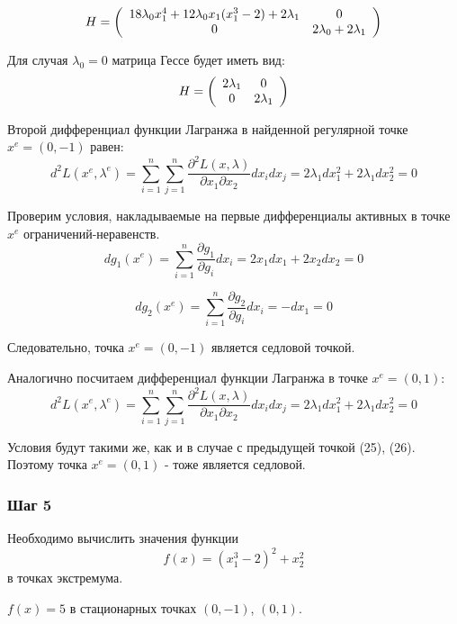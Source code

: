 \documentclass[a4paper, 12pt]{article}   	%
\begin{document}
    \begin{equation}
        H = 
        \left(
        \begin{array}{c c}
            18 \lambda_0 x_1^4 + 12 \lambda_0 x_1 (x_1^3 - 2) + 2 \lambda_1 & 0\\
            0 & 2 \lambda_0 + 2 \lambda_1
        \end{array}
        \right)
    \end{equation}
    
    Для случая $\lambda_0 = 0$ матрица Гессе будет иметь вид:
    \begin{equation}
        H = 
        \left(
        \begin{array}{c c}
            2 \lambda_1 & 0\\
            0 & 2 \lambda_1
        \end{array}
        \right)
    \end{equation}
    
    Второй дифференциал функции Лагранжа в найденной регулярной точке $x^e = (0, -1)$ равен:
    \begin{equation}
        d^2 L(x^e, \lambda^e) = \sum^{n}_{i=1} \sum^{n}_{j=1}{\frac{\partial^2 L(x, \lambda)}{\partial x_1 \partial x_2 } dx_i dx_j} = 2 \lambda_1 dx_1^2 + 2 \lambda_1 dx_2^2 = 0
    \end{equation}
    
    Проверим условия, накладываемые на первые дифференциалы активных в точке $x^e$ ограничений-неравенств.
    \begin{equation}
        dg_1(x^e) = \sum^{n}_{i=1}{\frac{\partial g_1}{\partial g_i} dx_i} = 2x_1 dx_1 + 2x_2 dx_2 = 0
    \end{equation}
    
    \begin{equation}
        dg_2(x^e) = \sum^{n}_{i=1}{\frac{\partial g_2}{\partial g_i} dx_i} = -dx_1 = 0
    \end{equation}
    
    Следовательно, точка $x^e = (0, -1)$ является седловой точкой.
    
    Аналогично посчитаем дифференциал функции Лагранжа в точке $x^e = (0, 1)$:
    \begin{equation}
        d^2 L(x^e, \lambda^e) = \sum^{n}_{i=1} \sum^{n}_{j=1}{\frac{\partial^2 L(x, \lambda)}{\partial x_1 \partial x_2 } dx_i dx_j} = 2 \lambda_1 dx_1^2 + 2 \lambda_1 dx_2^2 = 0
    \end{equation}
    
    Условия будут такими же, как и в случае с предыдущей точкой (25), (26). Поэтому точка $x^e = (0, 1)$ - тоже является седловой.
    
    

\subsubsection{Шаг 5}
    Необходимо вычислить значения функции 
    \begin{equation}
        f(x) = (x^3_1 - 2)^2 + x^2_2 
    \end{equation}
    в точках экстремума.
    
    $f(x) = 5$ в стационарных точках $(0, -1)$, $(0, 1)$.
\end{document}
